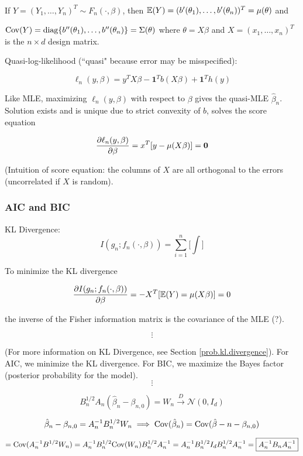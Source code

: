\

If \(Y = (Y_1, \ldots, Y_n)^T \sim F_n(\cdot, \beta)\), then \(\E(Y) = (b'(\theta_1), \ldots, b'(\theta_n))^T = \mu(\theta)\) and 

\(\Cov(Y) = \operatorname{diag}\{b''(\theta_1), \ldots, b''(\theta_n)\} = \Sigma(\theta)\) where \(\theta = X \beta\) and \(X = (x_1, \ldots ,x_n)^T\) is the \(n \times d\) design matrix.

Quasi-log-likelihood (``quasi" because error may be misspecified):

\[
\ell_n(y, \beta) = y^T X \beta - \boldsymbol{1}^Tb(X \beta) + \boldsymbol{1}^T h(y)
\]

Like MLE, maximizing \(\ell_n(y, \beta)\) with respect to \(\beta\) gives the quasi-MLE \(\hat{\beta}_n\). Solution exists and is unique due to strict convexity of \(b\), solves the score equation

\[
\pderiv{\ell_n(y,\beta)}{\beta} = x^T[y - \mu(X \beta)] = \boldsymbol{0}
\]

(Intuition of score equation: the columns of \(X\) are all orthogonal to the errors (uncorrelated if \(X\) is random).


\subsubsection{AIC and BIC}\label{linreg.aic.bic}

KL Divergence:
\[
I(g_n; f_n(\cdot, \beta)) = \sum_{i=1}^n \bigg[ \int \bigg]
\]

To minimize the KL divergence

\[
\pderiv{I(g_n; f_n(\cdot, \beta))}{\beta} = - X^T [ \E(Y) = \mu(X \beta)] = 0
\]

the inverse of the Fisher information matrix is the covariance of the MLE (?).

\[
\vdots
\]

(For more information on KL Divergence, see Section \ref{prob.kl.divergence}). For AIC, we minimize the KL divergence. For BIC, we maximize the Bayes factor (posterior probability for the model).
\[
\vdots
\]

\[
B_n^{1/2} A_n(\hat{\beta}_n - \beta_{n,0} ) = W_n \xrightarrow{D} \mathcal{N}(0, I_d)
\]

\[
\hat{\beta}_n - \beta_{n,0} = A_n^{-1} B_n^{1/2} W_n \implies \Cov(\hat{\beta}_n) = \Cov(\hat{\beta}-n - \beta_{n,0})
\]

\[ 
= \Cov(A_n^{-1} B^{1/2} W_n) = A_n^{-1}B_n^{1/2} \Cov(W_n) B_n^{1/2} A_n^{-1} = A_n^{-1}B_n^{1/2} I_d B_n^{1/2} A_n^{-1} = \boxed{A_n^{-1} B_n A_n^{-1}}
\]

